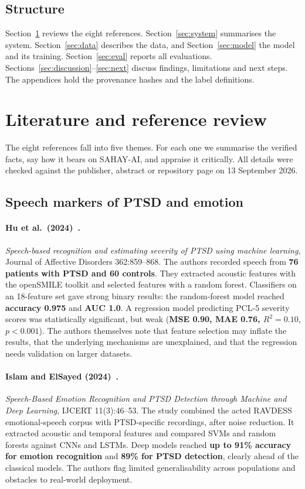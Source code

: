 \documentclass[11pt,a4paper]{article}
\begin{document}
\subsection{Structure}
Section~\ref{sec:lit} reviews the eight references. Section~\ref{sec:system} summarises the system.
Section~\ref{sec:data} describes the data, and Section~\ref{sec:model} the model and its training.
Section~\ref{sec:eval} reports all evaluations. Sections~\ref{sec:discussion}--\ref{sec:next}
discuss findings, limitations and next steps. The appendices hold the provenance hashes and the
label definitions.

\section{Literature and reference review}
\label{sec:lit}

The eight references fall into five themes. For each one we summarise the verified facts, say how it
bears on SAHAY-AI, and appraise it critically. All details were checked against the publisher,
abstract or repository page on 13 September 2026.

\subsection{Speech markers of PTSD and emotion}

\paragraph{Hu et al.\ (2024)~\cite{hu2024}.} \emph{Speech-based recognition and estimating severity of
PTSD using machine learning}, Journal of Affective Disorders 362:859--868. The authors recorded
speech from \textbf{76 patients with PTSD and 60 controls}. They extracted acoustic features with
the openSMILE toolkit and selected features with a random forest. Classifiers on an 18-feature set
gave strong binary results: the random-forest model reached \textbf{accuracy 0.975} and \textbf{AUC 1.0}.
A regression model predicting PCL-5 severity scores was statistically significant, but weak
(\textbf{MSE 0.90, MAE 0.76, $R^2 = 0.10$}, $p<0.001$). The authors themselves note that feature
selection may inflate the results, that the underlying mechanisms are unexplained, and that the
regression needs validation on larger datasets.

\paragraph{Islam and ElSayed (2024)~\cite{islam2024}.} \emph{Speech-Based Emotion Recognition and PTSD
Detection through Machine and Deep Learning}, IJCERT 11(3):46--53. The study combined the acted
RAVDESS emotional-speech corpus with PTSD-specific recordings, after noise reduction. It extracted
acoustic and temporal features and compared SVMs and random forests against CNNs and LSTMs. Deep
models reached \textbf{up to 91\% accuracy for emotion recognition} and \textbf{89\% for PTSD
detection}, clearly ahead of the classical models. The authors flag limited generalisability across
populations and obstacles to real-world deployment.
\end{document}
